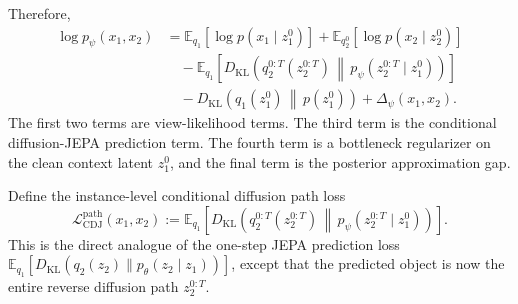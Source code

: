 \documentclass{article}
\newcommand{\E}{\mathbb{E}}
\newcommand{\KL}{D_{\mathrm{KL}}}
\begin{document}
Therefore,
\begin{align}
\log p_\psi(x_1,x_2)
&=
\E_{q_1}
\left[
\log p(x_1\mid z_1^0)
\right]
+
\E_{q_2^0}
\left[
\log p(x_2\mid z_2^0)
\right]
\nonumber \\
&\quad
-
\E_{q_1}
\left[
\KL
\left(
q_2^{0:T}(z_2^{0:T})
\,\middle\|\,
p_\psi(z_2^{0:T}\mid z_1^0)
\right)
\right]
\nonumber \\
&\quad
-
\KL
\left(
q_1(z_1^0)
\,\middle\|\,
p(z_1^0)
\right)
+
\Delta_\psi(x_1,x_2).
\label{eq:cdj-elbo-decomposition-simple}
\end{align}
The first two terms are view-likelihood terms. The third term is the
conditional diffusion-JEPA prediction term. The fourth term is a bottleneck
regularizer on the clean context latent $z_1^0$, and the final term is the
posterior approximation gap.

Define the instance-level conditional diffusion path loss
\begin{equation}
\mathcal L_{\mathrm{CDJ}}^{\mathrm{path}}(x_1,x_2)
:=
\E_{q_1}
\left[
\KL
\left(
q_2^{0:T}(z_2^{0:T})
\,\middle\|\,
p_\psi(z_2^{0:T}\mid z_1^0)
\right)
\right].
\label{eq:cdj-path-loss-instance-simple}
\end{equation}
This is the direct analogue of the one-step JEPA prediction loss
$\E_{q_1}[\KL(q_2(z_2)\|p_\theta(z_2\mid z_1))]$, except that the predicted
object is now the entire reverse diffusion path $z_2^{0:T}$.
\end{document}
